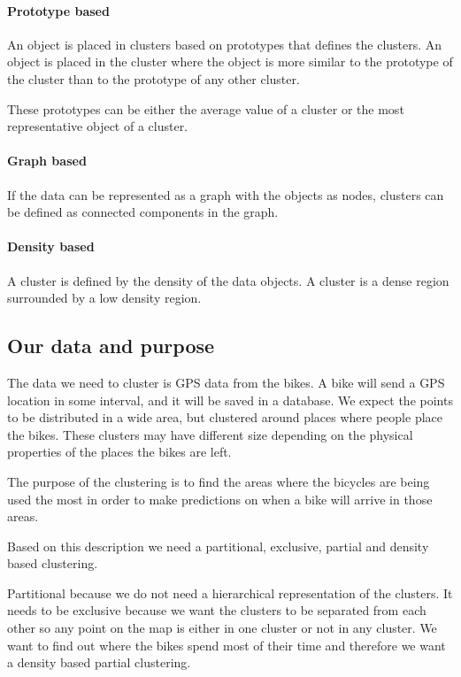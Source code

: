 \paragraph{Prototype based}
An object is placed in clusters based on prototypes that defines the clusters.
An object is placed in the cluster where the object is more similar to the prototype of the cluster than to the prototype of any other cluster.

These prototypes can be either the average value of a cluster or the most representative object of a cluster.

\paragraph{Graph based}
If the data can be represented as a graph with the objects as nodes, clusters can be defined as connected components in the graph.

\paragraph{Density based}
A cluster is defined by the density of the data objects.
A cluster is a dense region surrounded by a low density region.

\subsection{Our data and purpose}
The data we need to cluster is GPS data from the bikes.
A bike will send a GPS location in some interval, and it will be saved in a database.
We expect the points to be distributed in a wide area, but clustered around places where people place the bikes.
These clusters may have different size depending on the physical properties of the places the bikes are left.

The purpose of the clustering is to find the areas where the bicycles are being used the most in order to make predictions on when a bike will arrive in those areas.

Based on this description we need a partitional, exclusive, partial and density based clustering.

Partitional because we do not need a hierarchical representation of the clusters.
It needs to be exclusive because we want the clusters to be separated from each other so any point on the map is either in one cluster or not in any cluster.
We want to find out where the bikes spend most of their time and therefore we want a density based partial clustering.

